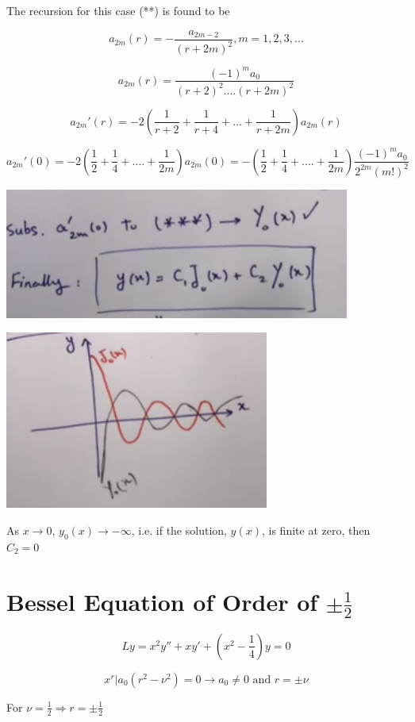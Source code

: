 The recursion for this case (**) is found to be 

$$a_{2m} (r) = - \frac{a_{2m-2}}{(r + 2m)^2}, m = 1,2,3,...$$

$$a_{2m}(r) = \frac{(-1)^m a_0}{(r+2)^2 .... (r + 2m)^2}$$

$$a_{2m}' (r) = -2 \left( \frac{1}{r+2} + \frac{1}{r+4} + ... + \frac{1}{r + 2m} \right) a_{2m} (r)$$

$$a_{2m}' (0) = -2 \left( \frac{1}{2} + \frac{1}{4} + .... + \frac{1}{2m} \right) a_{2m}(0) = - \left(\frac{1}{2} + \frac{1}{4} + .... + \frac{1}{2m} \right) \frac{(-1)^m a_0}{2^{2m} (m!)^2} $$

\includegraphics[width = 0.8 \textwidth]{image3.png}

\includegraphics[width = 0.8 \textwidth]{image4.png}

As $x \to 0$, $y_0 (x) \to - \infty$, i.e. if the solution, $y(x)$, is finite at zero, then $C_2 = 0$

\section{Bessel Equation of Order of $\pm \frac{1}{2}$}

$$Ly = x^2 y'' + xy' + (x^2 - \frac{1}{4} )y = 0$$

$$x^r | a_0 (r^2 - \nu^2) = 0 \longrightarrow a_0 \neq 0 \text{ and } r = \pm \nu$$

For $\nu = \frac{1}{2} \Rightarrow r = \pm \frac{1}{2}$

